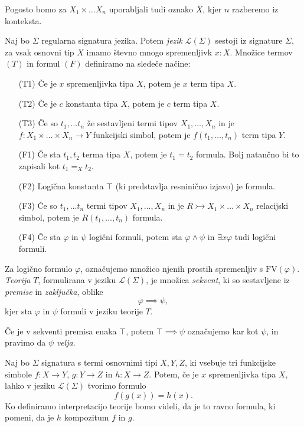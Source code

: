 \documentclass[../kategoricna_logika.tex]{subfiles}
\begin{document}
Pogosto bomo za $X_1 \times \ldots X_n$ uporabljali tudi oznako $\bar{X}$,
kjer $n$ razberemo iz konteksta.
\begin{definicija}
  Naj bo $\Sigma$ regularna signatura jezika.
  Potem \emph{jezik} $\mathcal{L}(\Sigma)$ sestoji iz signature $\Sigma$,
  za vsak osnovni tip $X$ imamo števno mnogo spremenljivk $x:X$.
  Množice termov $(T)$ in formul $(F)$ definiramo na sledeče načine:
  \begin{itemize}
    \item [(T1)] Če je $x$ spremenljivka tipa $X$, potem je $x$ term tipa $X$.
    \item [(T2)] Če je $c$ konstanta tipa $X$, potem je $c$ term tipa $X$.
    \item [(T3)] Če so $t_1, \ldots t_n$ že sestavljeni termi tipov $X_1, \ldots, X_n$
      in je $f : X_1 \times \ldots \times X_n \to Y$ funkcijski simbol,
      potem je $f(t_1, \ldots, t_n)$ term tipa $Y$.
    \item [(F1)] Če sta $t_1, t_2$ terma tipa $X$, potem je $t_1 = t_2$ formula. Bolj natančno bi to zapisali kot $t_1 =_X t_2$.
    \item [(F2)] Logična konstanta $\top$ (ki predstavlja resninično izjavo) je formula.
    \item [(F3)] Če so $t_1, \ldots t_n$ termi tipov $X_1, \ldots, X_n$ in je $R \rightarrowtail X_1 \times \ldots \times X_n$ relacijski simbol, potem je $R(t_1, \ldots, t_n)$ formula.
    \item [(F4)] Če sta $\varphi$ in $\psi$ logični formuli, potem sta $\varphi \wedge \psi$ in $\exists x \varphi$ tudi logični formuli.
  \end{itemize}
  Za logično formulo $\varphi$,
  označujemo množico njenih prostih spremenljiv s $\mathrm{FV}(\varphi)$.
  \emph{Teorija} $T$, formulirana v jeziku $\mathcal{L}(\Sigma)$,
  je množica \emph{sekvent}, ki so sestavljene iz \emph{premise} in \emph{zaključka}, oblike 
  $$\varphi \implies \psi,$$
  kjer sta $\varphi$ in $\psi$ formuli v jeziku teorije $T$.
\end{definicija}
Če je v sekventi premisa enaka $\top$, potem $\top \implies \psi$ označujemo kar kot $\psi$,
in pravimo da $\psi$ \emph{velja}.
\begin{primer}\label{primer:kompozitum}
  Naj bo $\Sigma$ signatura s termi osnovnimi tipi $X,Y,Z$,
  ki vsebuje tri funkcijske simbole $f: X \to Y$, $g : Y \to Z$ in $h : X \to Z$.
  Potem, če je $x$ spremenljivka tipa $X$, lahko v jeziku $\mathcal{L}(\Sigma)$ tvorimo formulo
  $$f(g(x)) = h(x).$$
  Ko definiramo interpretacijo teorije bomo videli, da je to ravno formula, ki pomeni, da je $h$ kompozitum $f$ in $g$.
\end{primer}
\end{document}
